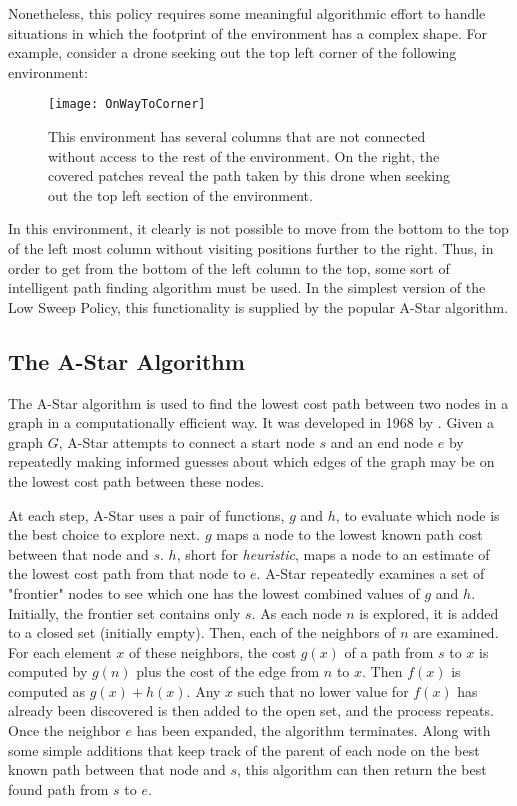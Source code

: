 Nonetheless, this policy requires some meaningful algorithmic effort to handle situations in which the footprint of the environment has a complex shape. For example, consider a drone seeking out the top left corner of the following environment:

\begin{figure}[H]
\texttt{[image: OnWayToCorner]}
\caption[Environment with non-continuous columns]{This environment has several columns that are not connected without access to the rest of the environment. On the right, the covered patches reveal the path taken by this drone when seeking out the top left section of the environment.}
\end{figure}

In this environment, it clearly is not possible to move from the bottom to the top of the left most column without visiting positions further to the right. Thus, in order to get from the bottom of the left column to the top, some sort of intelligent path finding algorithm must be used. In the simplest version of the Low Sweep Policy, this functionality is supplied by the popular A-Star algorithm.

\subsection{The A-Star Algorithm}

The A-Star algorithm is used to find the lowest cost path between two nodes in a graph in a computationally efficient way. It was developed in 1968 by \citeauthor{A-Star} \cite{A-Star}. Given a graph $ G $, A-Star attempts to connect a start node $s$ and an end node $e$ by repeatedly making informed guesses about which edges of the graph may be on the lowest cost path between these nodes.

At each step, A-Star uses a pair of functions, $g$ and $h$, to evaluate which node is the best choice to explore next. $g$ maps a node to the lowest known path cost between that node and $s$. $h$, short for \textit{heuristic}, maps a node to an estimate of the lowest cost path from that node to $e$. A-Star repeatedly examines a set of "frontier" nodes to see which one has the lowest combined values of $g$ and $h$. Initially, the frontier set contains only $s$. As each node $n$ is explored, it is added to a closed set (initially empty). Then, each of the neighbors of $n$ are examined. For each element $x$ of these neighbors, the cost $g(x)$ of a path from $s$ to $x$ is computed by $g(n)$ plus the cost of the edge from $n$ to $x$. Then $f(x)$ is computed as $g(x) + h(x)$. Any $x$ such that no lower value for $f(x)$ has already been discovered is then added to the open set, and the process repeats. Once the neighbor $e$ has been expanded, the algorithm terminates. Along with some simple additions that keep track of the parent of each node on the best known path between that node and $s$, this algorithm can then return the best found path from $s$ to $e$. 

